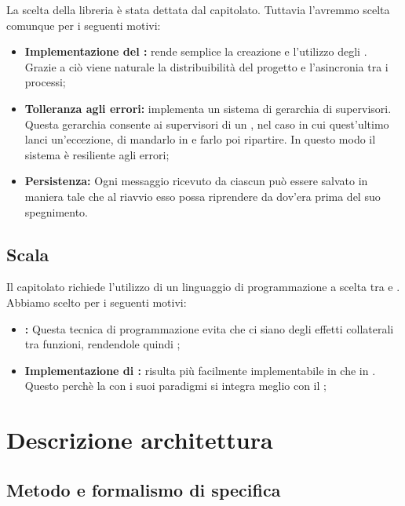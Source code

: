 \documentclass{scalatekids-article}
\begin{document}
La scelta della libreria  è stata dettata dal capitolato. Tuttavia
l'avremmo scelta comunque per i seguenti motivi:
\begin{itemize}
\item\textbf{Implementazione del :} 
  rende semplice la creazione e l'utilizzo degli . Grazie a ciò
  viene naturale la distribuibilità del progetto e l'asincronia tra i processi;
\item\textbf{Tolleranza agli errori:}  implementa un sistema di
  gerarchia di supervisori. Questa gerarchia consente ai supervisori di un
  , nel caso in cui quest'ultimo lanci un'eccezione, di mandarlo
  in  e farlo poi ripartire. In questo modo il sistema è resiliente
  agli errori;
\item\textbf{Persistenza:} Ogni messaggio ricevuto da ciascun 
  può essere salvato in maniera tale che al riavvio esso possa riprendere da
  dov'era prima del suo spegnimento.
\end{itemize}

\subsection{Scala}

Il capitolato richiede l'utilizzo di un linguaggio di programmazione a scelta
tra  e . Abbiamo scelto  per i seguenti
motivi:

\begin{itemize}
\item\textbf{:} Questa tecnica di
  programmazione evita che ci siano degli effetti collaterali tra funzioni,
  rendendole quindi ;
\item\textbf{Implementazione di :}  risulta più
  facilmente implementabile in  che in . Questo perchè
  la  con i suoi paradigmi si integra meglio
  con il ;%
\end{itemize}

\section{Descrizione architettura}

\subsection{Metodo e formalismo di specifica}
\end{document}
